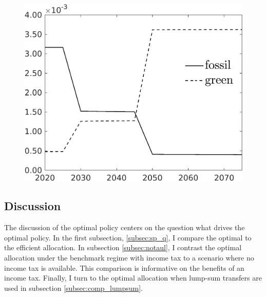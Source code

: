 \begin{figure}[h!!]
\begin{minipage}[]{0.32\textwidth}
		\includegraphics[width=1\textwidth]{../../codding_model/own_basedOnFried/optimalPol_190722_tidiedUp/figures/all_July22/SingleJointTOT_regime3_OPT_T_NoTaus_LabourInp_spillover0_noskill0_sep1_xgrowth0_extern0_etaa0.79_lgd1.png}
	\end{minipage}
\end{figure} 



\subsection{Discussion}\label{subsec:dis}
The discussion of the optimal policy centers on the question what drives the optimal policy. In the first subsection, \ref{subsec:sp_q}, I compare the optimal to the efficient allocation. In subsection \ref{subsec:notaul}, I contrast the optimal allocation under the benchmark regime with income tax to a scenario where no income tax is available. This comparison is informative on the benefits of an income tax.
Finally, I turn to the optimal allocation when lump-sum transfers are used in subsection \ref{subsec:comp_lumpsum}. 

